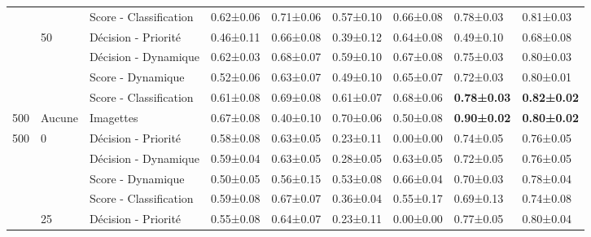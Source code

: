 \begin{landscape}
\begin{table}[]
\begin{tabular}{lllllllll}
							        &                                   & Score - Classification                    & 0.62±0.06         & 0.71±0.06     & 0.57±0.10         & 0.66±0.08     & 0.78±0.03         & 0.81±0.03         \\ \cline{2-9}
							        & \multirow{4}{*}{50}               & Décision - Priorité                    & 0.46±0.11         & 0.66±0.08     & 0.39±0.12         & 0.64±0.08     & 0.49±0.10         & 0.68±0.08         \\
							        &                                   & Décision - Dynamique                    & 0.62±0.03         & 0.68±0.07     & 0.59±0.10         & 0.67±0.08     & 0.75±0.03         & 0.80±0.03         \\
							        &                                   & Score - Dynamique               & 0.52±0.06         & 0.63±0.07     & 0.49±0.10         & 0.65±0.07     & 0.72±0.03         & 0.80±0.01         \\ 
		                            &                                   & Score - Classification                    & 0.61±0.08         & 0.69±0.08     & 0.61±0.07         & 0.68±0.06     & \textbf{0.78±0.03}& \textbf{0.82±0.02}\\ \midrule
		500                         & Aucune                            & Imagettes                 & 0.67±0.08         & 0.40±0.10     & 0.70±0.06         & 0.50±0.08     & \textbf{0.90±0.02}& \textbf{0.80±0.02}\\ \midrule
		\multirow{12}{*}{500}       & \multirow{4}{*}{0}                & Décision - Priorité                    & 0.58±0.08         & 0.63±0.05     & 0.23±0.11         & 0.00±0.00     & 0.74±0.05         & 0.76±0.05         \\
							        &                                   & Décision - Dynamique                    & 0.59±0.04         & 0.63±0.05     & 0.28±0.05         & 0.63±0.05     & 0.72±0.05         & 0.76±0.05         \\
							        &                                   & Score - Dynamique               & 0.50±0.05         & 0.56±0.15     & 0.53±0.08         & 0.66±0.04     & 0.70±0.03         & 0.78±0.04         \\
							        &                                   & Score - Classification                    & 0.59±0.08         & 0.67±0.07     & 0.36±0.04         & 0.55±0.17     & 0.69±0.13         & 0.74±0.08         \\ \cline{2-9}
							        & \multirow{4}{*}{25}               & Décision - Priorité                    & 0.55±0.08         & 0.64±0.07     & 0.23±0.11         & 0.00±0.00     & 0.77±0.05         & 0.80±0.04         \\

\end{tabular}
\end{table}
\end{landscape}
